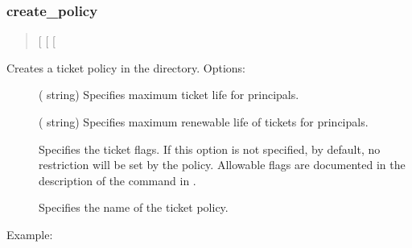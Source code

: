 \documentclass[letterpaper,10pt,english]{sphinxmanual}
\begin{document}
\subsubsection{create\_policy}
\label{\detokenize{admin/admin_commands/kdb5_ldap_util:create-policy}}\label{\detokenize{admin/admin_commands/kdb5_ldap_util:kdb5-ldap-util-stashsrvpw-end}}\label{\detokenize{admin/admin_commands/kdb5_ldap_util:kdb5-ldap-util-create-policy}}\begin{quote}

\sphinxAtStartPar
{}
{[} \sphinxstyleemphasis{max\_ticket\_life}{]}
{[} \sphinxstyleemphasis{max\_renewable\_ticket\_life}{]}
{[}\sphinxstyleemphasis{ticket\_flags}{]}
\end{quote}

\sphinxAtStartPar
Creates a ticket policy in the directory.  Options:
\begin{description}
\item[{ }] \leavevmode
\sphinxAtStartPar
( string) Specifies maximum ticket life for
principals.

\item[{ }] \leavevmode
\sphinxAtStartPar
( string) Specifies maximum renewable life of
tickets for principals.

\item[{}] \leavevmode
\sphinxAtStartPar
Specifies the ticket flags.  If this option is not specified, by
default, no restriction will be set by the policy.  Allowable
flags are documented in the description of the 
command in {\hyperref[\detokenize{admin/admin_commands/kadmin_local:kadmin-1}]{}}.

\item[{}] \leavevmode
\sphinxAtStartPar
Specifies the name of the ticket policy.

\end{description}

\sphinxAtStartPar
Example:
\end{document}
